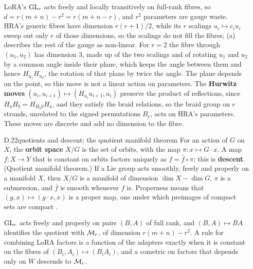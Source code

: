 LoRA's $\mathrm{GL}_r$ acts freely and locally transitively on full-rank fibres, so $d=r(m+n)-r^2=r(m+n-r)$, and $r^2$
parameters are gauge waste. HRA's generic fibres have dimension $r(r+1)/2$, while its $r$ scalings $u_i\mapsto c_iu_i$
sweep out only $r$ of those dimensions, so the scalings do not fill the fibres; (a) describes the
rest of the gauge as non-linear. For $r=2$ the fibre through $(u_1,u_2)$ has dimension $3$, made up of the two scalings
and of rotating $u_1$ and $u_2$ by a common angle inside their plane, which keeps the angle between them and hence
$H_{u_1}H_{u_2}$, the rotation of that plane by twice the angle. The plane depends on the point, so this move is not a
linear action on parameters. The \textbf{Hurwitz moves} $(u_i,u_{i+1})\mapsto(H_{u_i}u_{i+1},u_i)$ preserve the product
of reflections, since $H_aH_b=H_{H_ab}H_a$, and they satisfy the braid relations, so the braid group on $r$ strands,
unrelated to the signed permutations $B_r$, acts on HRA's parameters. These moves are discrete and add no dimension to
the fibre.


\begin{bgfact}{D.22}{quotients and descent; the quotient manifold theorem}
For an action of $G$ on $X$, the \textbf{orbit space} $X/G$ is the set of orbits, with the map $\pi:x\mapsto G\cdot x$.
A map $f:X\to Y$ that is constant on orbits factors uniquely as $f=\bar f\circ\pi$; this is \textbf{descent}. (Quotient
manifold theorem.) If a Lie group acts smoothly, freely and properly on a manifold $X$, then $X/G$ is a manifold of
dimension $\dim X-\dim G$, $\pi$ is a submersion, and $\bar f$ is smooth whenever $f$ is. Properness means that
$(g,x)\mapsto(g\cdot x,x)$ is a proper map, one under which preimages of compact sets are compact
\citep[Thm~21.10]{xlee2013introduction}.
\end{bgfact}

$\mathrm{GL}_r$ acts freely and properly on pairs $(B,A)$ of full rank, and $(B,A)\mapsto BA$ identifies the quotient with
$\mathcal{M}_r$, of dimension $r(m+n)-r^2$. A rule for combining LoRA factors is a function of the adapters exactly when it is
constant on the fibres of $(B_i,A_i)\mapsto(B_iA_i)$, and a cometric on factors that depends only on $W$ descends to
$\mathcal{M}_r$.

